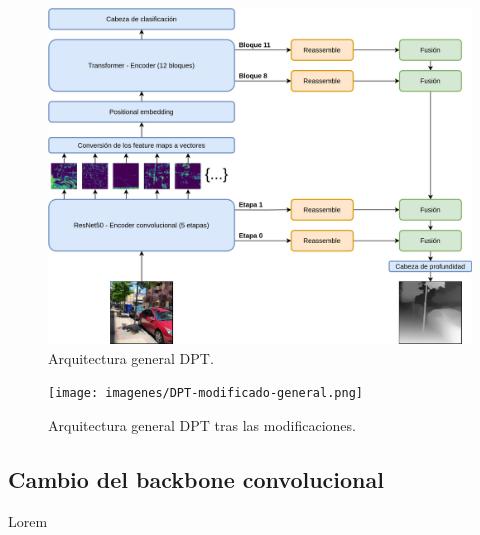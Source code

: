 \begin{figure}[H]
\centering
\includegraphics[width=\textwidth]{imagenes/DPT-general.png}
\caption{Arquitectura general DPT.}
\label{fig:dpt-general}
\end{figure}

\begin{figure}[H]
\centering
\texttt{[image: imagenes/DPT-modificado-general.png]}
\caption{Arquitectura general DPT tras las modificaciones.}
\label{fig:dpt-mod-general}
\end{figure}

\subsection{Cambio del backbone convolucional}
Lorem



\clearpage